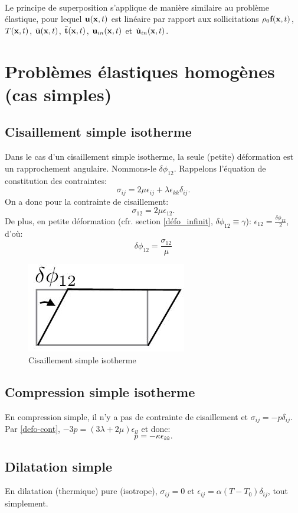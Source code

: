 \paragraph{}
Le principe de superposition s'applique de manière similaire au problème élastique, pour lequel $\textbf{u}(\textbf{x},t)$ est linéaire par rapport aux sollicitations $\rho_0\textbf{f}(\textbf{x},t)$, $T(\textbf{x},t)$, $\bar{\textbf{u}}(\textbf{x},t)$, $\bar{\textbf{t}}(\textbf{x},t)$, $\textbf{u}_{in}(\textbf{x},t)$ et $\dot{\textbf{u}}_{in}(\textbf{x},t)$.

\section{Problèmes élastiques homogènes (cas simples)}
\subsection{Cisaillement simple isotherme}
Dans le cas d'un cisaillement simple isotherme, la seule (petite) déformation est un rapprochement angulaire. Nommons-le $\delta\phi_{12}$. Rappelons l'équation de constitution des contraintes:
$$\sigma_{ij}=2\mu\epsilon_{ij}+\lambda\epsilon_{kk}\delta_{ij}.$$ On a donc pour la contrainte de cisaillement:
$$\sigma_{12}=2\mu\epsilon_{12}.$$ De plus, en petite déformation (cfr. section \ref{défo_infinit}, $\delta\phi_{12}\equiv \gamma$): $\epsilon_{12}=\frac{\delta\phi_{12}}{2}$, d'où:
$$\delta\phi_{12}=\frac{\sigma_{12}}{\mu}$$
\begin{figure}[!h]
\centering
\includegraphics[scale=0.6]{./cisaillementsimplefig.jpg}
\caption{Cisaillement simple isotherme}
\label{fig:cis}
\end{figure}
\subsection{Compression simple isotherme}
En compression simple, il n'y a pas de contrainte de cisaillement et $\sigma_{ij}=-p\delta_{ij}$. Par \ref{defo-cont}, $-3p=(3\lambda+2\mu)\epsilon_{ll}$ et donc:
$$p=-\kappa\epsilon_{kk}.$$

\subsection{Dilatation simple}
En dilatation (thermique) pure (isotrope), $\sigma_{ij}=0$ et $\epsilon_{ij}=\alpha(T-T_0)\delta_{ij}$, tout simplement.
